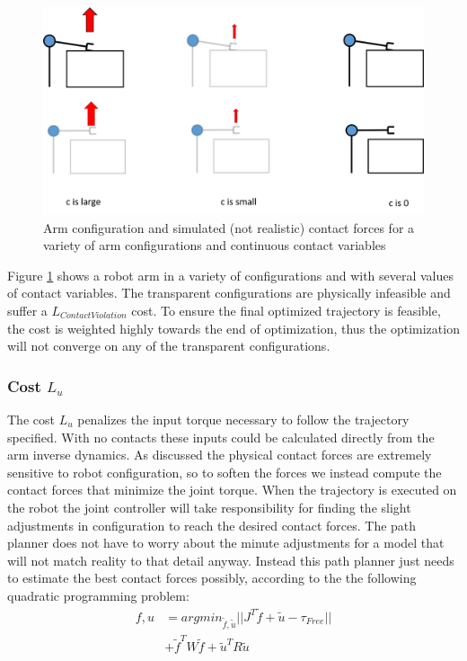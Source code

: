\documentclass[../thesis.tex]{subfiles}
\begin{document}
\begin{figure}
  \centering
  \includegraphics[width=.7\linewidth]{./Planning/ContactArms.png}
  \caption{Arm configuration and simulated (not realistic) contact forces for a variety of arm configurations and continuous contact variables}
  \label{fig:ContactArms}
\end{figure}

Figure \ref{fig:ContactArms} shows a robot arm in a variety of configurations and with several values of contact variables.
The transparent configurations are physically infeasible and suffer a $L_{Contact Violation}$ cost.
To ensure the final optimized trajectory is feasible, the cost is weighted highly towards the end of optimization, thus the optimization will not converge on any of the transparent configurations.


\subsubsection{Cost $L_u$}

The cost $L_u$ penalizes the input torque necessary to follow the trajectory specified. With no contacts these inputs could be calculated directly from the arm inverse dynamics. As discussed the physical contact forces are extremely sensitive to robot configuration, so to soften the forces we instead compute the contact forces that minimize the joint torque. When the trajectory is executed on the robot the joint controller will take responsibility for finding the slight adjustments in configuration to reach the desired contact forces. The path planner does not have to worry about the minute adjustments for a model that will not match reality to that detail anyway. Instead this path planner just needs to estimate the best contact forces possibly, according to the the following quadratic programming problem:
\begin{align*}
f, u &= argmin_{\tilde{f}, \tilde{u}} ||J^T\tilde{f} + \tilde{u} - \tau_{Free}|| \\
&+ \tilde{f}^T W \tilde{f} + \tilde{u}^T R \tilde{u}
\end{align*}
\end{document}
